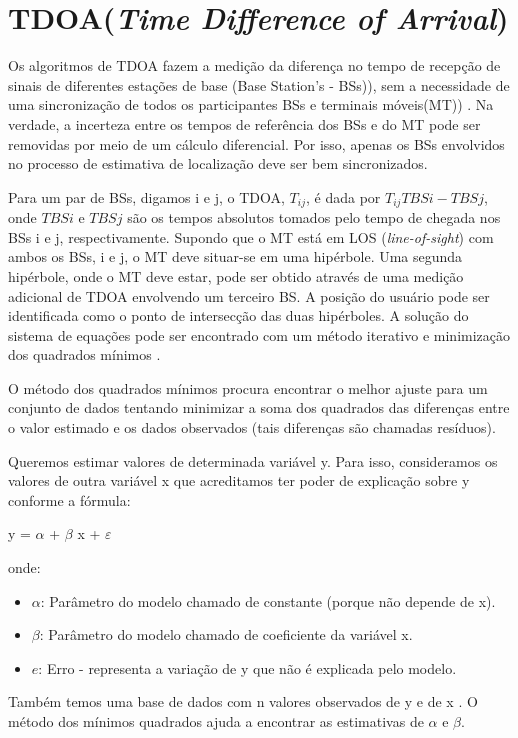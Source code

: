 \section{TDOA(\textit{Time Difference of Arrival})}
  Os algoritmos de TDOA fazem a medição da diferença no tempo de recepção
de sinais de diferentes estações de base (Base Station's - BSs)), sem a necessidade de uma sincronização de
todos os participantes BSs e terminais móveis(MT)) \cite{tdoa}. Na verdade, a incerteza entre os tempos de referência
dos BSs e do MT pode ser removidas por meio de um cálculo diferencial. Por isso, apenas
os BSs envolvidos no processo de estimativa de localização deve ser bem sincronizados.

Para um par de BSs, digamos i e j, o TDOA,
$T_{ij}$, é dada por $T_{ij} TBSi - TBSj$, onde $TBSi$ e $TBSj$ são os tempos absolutos tomados 
pelo tempo de chegada nos BSs i e j, respectivamente. Supondo que o MT está em LOS (\textit{line-of-sight}) com ambos os BSs, i
e j, o MT deve situar-se em uma hipérbole. Uma segunda hipérbole, onde o
MT deve estar, pode ser obtido através de uma medição adicional de TDOA envolvendo
um terceiro BS. A posição do usuário pode ser identificada como o ponto de intersecção
das duas hipérboles. A solução do sistema de equações pode ser encontrado com um
método iterativo e minimização dos quadrados mínimos \cite{tdoa}.

O método dos quadrados mínimos procura encontrar 
o melhor ajuste para um conjunto de dados tentando minimizar a soma dos quadrados das diferenças 
entre o valor estimado e os dados observados (tais diferenças são chamadas resíduos).

Queremos estimar valores de determinada variável y. Para isso, consideramos os valores de outra variável x 
que acreditamos ter poder de explicação sobre y conforme a fórmula:

    y = $\alpha$ + $\beta$ x + $\varepsilon$

onde:
    \begin{itemize}
     \item $\alpha$: Parâmetro do modelo chamado de constante (porque não depende de x).
     \item  $\beta$: Parâmetro do modelo chamado de coeficiente da variável x.
     \item  $e$: Erro - representa a variação de y que não é explicada pelo modelo.
    \end{itemize}

Também temos uma base de dados com n valores observados de y e de x . 
O método dos mínimos quadrados ajuda a encontrar as estimativas de $\alpha$ e $\beta$.

